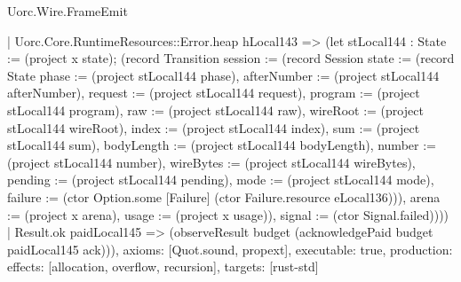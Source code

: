 \begin{lexlean}{Uorc.Wire.FrameEmit}
\begin{semanticmodule}
{      | Uorc.Core.RuntimeResources::Error.heap hLocal143 => (let stLocal144 : State := (project x state); (record Transition {session := (record Session {state := (record State {phase := (project stLocal144 phase), afterNumber := (project stLocal144 afterNumber), request := (project stLocal144 request), program := (project stLocal144 program), raw := (project stLocal144 raw), wireRoot := (project stLocal144 wireRoot), index := (project stLocal144 index), sum := (project stLocal144 sum), bodyLength := (project stLocal144 bodyLength), number := (project stLocal144 number), wireBytes := (project stLocal144 wireBytes), pending := (project stLocal144 pending), mode := (project stLocal144 mode), failure := (ctor Option.some [Failure] (ctor Failure.resource eLocal136))}), arena := (project x arena), usage := (project x usage)}), signal := (ctor Signal.failed)})))
    | Result.ok paidLocal145 => (observeResult budget (acknowledgePaid budget paidLocal145 ack))),
  axioms: [Quot.sound, propext],
  executable: true,
  production: {effects: [allocation, overflow, recursion], targets: [rust-std]}
}


\end{semanticmodule}
\end{lexlean}

